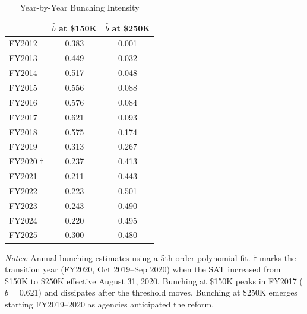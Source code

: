 \begin{table}[t]
\centering
\caption{Year-by-Year Bunching Intensity}
\label{tab:yearly}
\begin{threeparttable}
\begin{tabular}{lcc}
\toprule
 & $\hat{b}$ at \$150K & $\hat{b}$ at \$250K \\
\midrule
FY2012 & 0.383 & 0.001 \\
FY2013 & 0.449 & 0.032 \\
FY2014 & 0.517 & 0.048 \\
FY2015 & 0.556 & 0.088 \\
FY2016 & 0.576 & 0.084 \\
FY2017 & 0.621 & 0.093 \\
FY2018 & 0.575 & 0.174 \\
FY2019 & 0.313 & 0.267 \\
FY2020 $\dagger$ & 0.237 & 0.413 \\
FY2021 & 0.211 & 0.443 \\
FY2022 & 0.223 & 0.501 \\
FY2023 & 0.243 & 0.490 \\
FY2024 & 0.220 & 0.495 \\
FY2025 & 0.300 & 0.480 \\
\bottomrule
\end{tabular}
\begin{tablenotes}[flushleft]\small
\item \textit{Notes:} Annual bunching estimates using a 5th-order polynomial fit. $\dagger$ marks the transition year (FY2020, Oct 2019--Sep 2020) when the SAT increased from \$150K to \$250K effective August 31, 2020. Bunching at \$150K peaks in FY2017 ($\hat{b} = 0.621$) and dissipates after the threshold moves. Bunching at \$250K emerges starting FY2019--2020 as agencies anticipated the reform.
\end{tablenotes}
\end{threeparttable}
\end{table}


